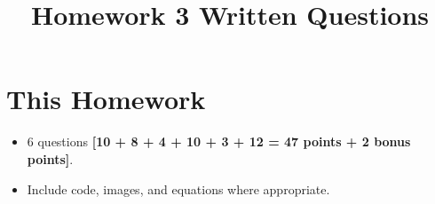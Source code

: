 \documentclass{csci1430}
\begin{document}
\title{Homework 3 Written Questions}
\maketitle
\thispagestyle{fancy}

\writeinstructions

\section*{This Homework}
\begin{itemize}
  \item 6 questions \textbf{[10 + 8 + 4 + 10 + 3 + 12 = 47 points + 2 bonus points]}.
  \item Include code, images, and equations where appropriate.
\end{itemize}

\pagebreak
\end{document}
